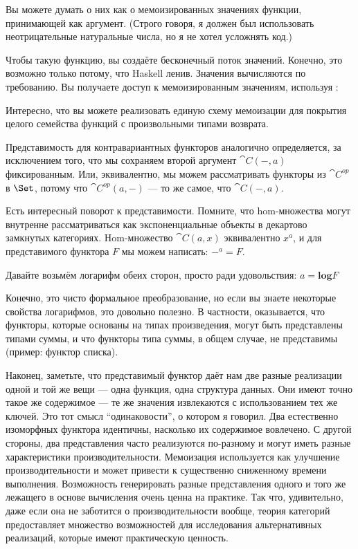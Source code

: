 Вы можете думать о них как о мемоизированных значениях функции, принимающей
 как аргумент. (Строго говоря, я должен был использовать
неотрицательные натуральные числа, но я не хотел усложнять код.)

Чтобы  такую функцию, вы создаёте бесконечный поток
значений. Конечно, это возможно только потому, что Haskell ленив.
Значения вычисляются по требованию. Вы получаете доступ к мемоизированным значениям, используя
:

Интересно, что вы можете реализовать единую схему мемоизации для
покрытия целого семейства функций с произвольными типами возврата.

Представимость для контравариантных функторов аналогично определяется, за исключением
того, что мы сохраняем второй аргумент $\cat{C}(-, a)$ фиксированным. Или,
эквивалентно, мы можем рассматривать функторы из $\cat{C}^\mathit{op}$
в $\Set$, потому что $\cat{C}^\mathit{op}(a, -)$ --- то же самое, что
$\cat{C}(-, a)$.

Есть интересный поворот к представимости. Помните, что
hom-множества могут внутренне рассматриваться как экспоненциальные объекты в декартово
замкнутых категориях. Hom-множество $\cat{C}(a, x)$ эквивалентно
$x^a$, и для представимого функтора $F$ мы можем написать: $-^a = F$.

Давайте возьмём логарифм обеих сторон, просто ради удовольствия: $a = \mathbf{log}F$

Конечно, это чисто формальное преобразование, но если вы знаете некоторые
свойства логарифмов, это довольно полезно. В частности,
оказывается, что функторы, которые основаны на типах произведения, могут быть
представлены типами суммы, и что функторы типа суммы, в общем случае, не
представимы (пример: функтор списка).

Наконец, заметьте, что представимый функтор даёт нам две разные
реализации одной и той же вещи --- одна функция, одна структура
данных. Они имеют точно такое же содержимое --- те же значения
извлекаются с использованием тех же ключей. Это тот смысл ``одинаковости'', о котором я
говорил. Два естественно изоморфных функтора идентичны, насколько
их содержимое вовлечено. С другой стороны, два представления
часто реализуются по-разному и могут иметь разные характеристики производительности.
Мемоизация используется как улучшение производительности и
может привести к существенно сниженному времени выполнения. Возможность генерировать
разные представления одного и того же лежащего в основе вычисления очень
ценна на практике. Так что, удивительно, даже если она не заботится
о производительности вообще, теория категорий предоставляет множество возможностей для
исследования альтернативных реализаций, которые имеют практическую ценность.

